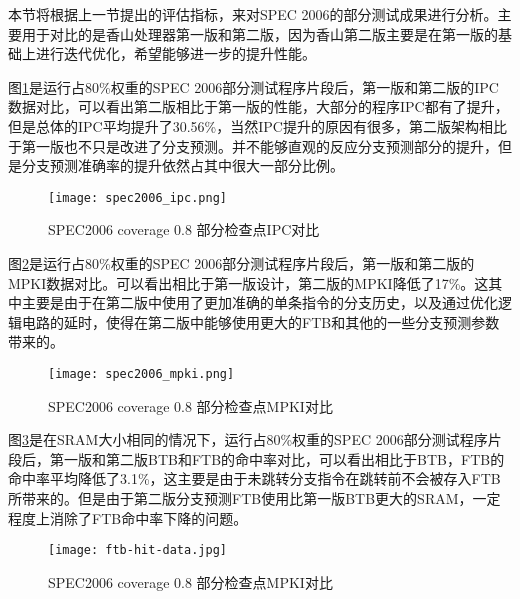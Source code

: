 本节将根据上一节提出的评估指标，来对SPEC 2006的部分测试成果进行分析。主要用于对比的是香山处理器第一版和第二版，因为香山第二版主要是在第一版的基础上进行迭代优化，希望能够进一步的提升性能。

图\ref{fig:figure61}是运行占80\%权重的SPEC 2006部分测试程序片段后，第一版和第二版的IPC数据对比，可以看出第二版相比于第一版的性能，大部分的程序IPC都有了提升，但是总体的IPC平均提升了30.56\%，当然IPC提升的原因有很多，第二版架构相比于第一版也不只是改进了分支预测。并不能够直观的反应分支预测部分的提升，但是分支预测准确率的提升依然占其中很大一部分比例。


\begin{figure}[htb]
	\centering
	\setlength\tabcolsep{3pt}  %
	\vspace{5pt} %
	\texttt{[image: spec2006\_ipc.png]}
	\caption{SPEC2006 coverage 0.8 部分检查点IPC对比}
	\label{fig:figure61}
\end{figure}

图\ref{fig:figure62}是运行占80\%权重的SPEC 2006部分测试程序片段后，第一版和第二版的MPKI数据对比。可以看出相比于第一版设计，第二版的MPKI降低了17\%。这其中主要是由于在第二版中使用了更加准确的单条指令的分支历史，以及通过优化逻辑电路的延时，使得在第二版中能够使用更大的FTB和其他的一些分支预测参数带来的。



\begin{figure}[htb]
	\centering
	\setlength\tabcolsep{3pt}  %
	\vspace{5pt} %
	\texttt{[image: spec2006\_mpki.png]}
	\caption{SPEC2006 coverage 0.8 部分检查点MPKI对比}
	\label{fig:figure62}
\end{figure}

图\ref{fig:figure63}是在SRAM大小相同的情况下，运行占80\%权重的SPEC 2006部分测试程序片段后，第一版和第二版BTB和FTB的命中率对比，可以看出相比于BTB，FTB的命中率平均降低了3.1\%，这主要是由于未跳转分支指令在跳转前不会被存入FTB所带来的。但是由于第二版分支预测FTB使用比第一版BTB更大的SRAM，一定程度上消除了FTB命中率下降的问题。



\begin{figure}[htb]
	\centering
	\setlength\tabcolsep{3pt}  %
	\vspace{5pt} %
	\texttt{[image: ftb-hit-data.jpg]}
	\caption{SPEC2006 coverage 0.8 部分检查点MPKI对比}
	\label{fig:figure63}
\end{figure}

